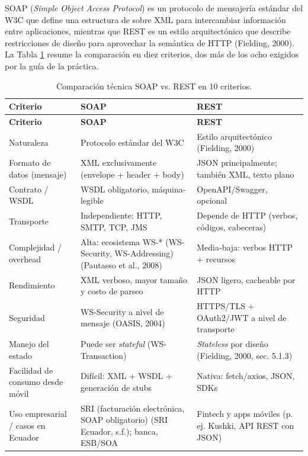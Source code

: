 \documentclass[11pt,a4paper]{article}
\newcommand{\swcite}[1]{\textcolor{blue!40!black}{(#1)}}
\begin{document}
SOAP (\emph{Simple Object Access Protocol}) es un protocolo de mensajería
estándar del W3C que define una estructura de sobre XML para intercambiar
información entre aplicaciones, mientras que REST es un estilo
arquitectónico que describe restricciones de diseño para aprovechar la
semántica de HTTP \swcite{Fielding, 2000}. La Tabla \ref{tab:soap-rest}
resume la comparación en diez criterios, dos más de los ocho exigidos por
la guía de la práctica.

\begin{longtable}{p{2.6cm}p{5.6cm}p{5.6cm}}
\caption{Comparación técnica SOAP vs. REST en 10 criterios.} \label{tab:soap-rest} \\
\toprule
\textbf{Criterio} & \textbf{SOAP} & \textbf{REST} \\
\midrule
\endfirsthead
\toprule
\textbf{Criterio} & \textbf{SOAP} & \textbf{REST} \\
\midrule
\endhead
Naturaleza & Protocolo estándar del W3C & Estilo arquitectónico \swcite{Fielding, 2000} \\
Formato de datos (mensaje) & XML exclusivamente (envelope + header + body) & JSON principalmente; también XML, texto plano \\
Contrato / WSDL & WSDL obligatorio, máquina-legible & OpenAPI/Swagger, opcional \\
Transporte & Independiente: HTTP, SMTP, TCP, JMS & Depende de HTTP (verbos, códigos, cabeceras) \\
Complejidad / overhead & Alta: ecosistema WS-* (WS-Security, WS-Addressing) \swcite{Pautasso et al., 2008} & Media-baja: verbos HTTP + recursos \\
Rendimiento & XML verboso, mayor tamaño y costo de parseo & JSON ligero, cacheable por HTTP \\
Seguridad & WS-Security a nivel de mensaje \swcite{OASIS, 2004} & HTTPS/TLS + OAuth2/JWT a nivel de transporte \\
Manejo del estado & Puede ser \emph{stateful} (WS-Transaction) & \emph{Stateless} por diseño \swcite{Fielding, 2000, sec. 5.1.3} \\
Facilidad de consumo desde móvil & Difícil: XML + WSDL + generación de stubs & Nativa: fetch/axios, JSON, SDKs \\
Uso empresarial / casos en Ecuador & SRI (facturación electrónica, SOAP obligatorio) \swcite{SRI Ecuador, s.f.}; banca, ESB/SOA & Fintech y apps móviles (p. ej. Kushki, API REST con JSON) \\
\bottomrule
\end{longtable}
\end{document}
